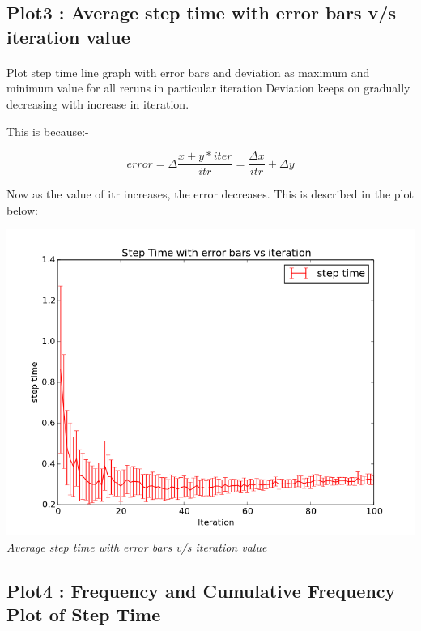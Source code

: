 \documentclass[11pt]{article}
\begin{document}

\subsection{Plot3 : Average step time with error bars v/s iteration value}
\paragraph{}
Plot step time line graph with error bars and deviation as maximum and minimum value for all reruns in particular iteration
Deviation keeps on gradually decreasing with increase in iteration.

This is because:-

\begin{equation}
	error = \Delta \frac {x + y*iter}{itr} = \frac {\Delta{x}}{itr} + \Delta{y}
\end{equation}

Now as the value of itr increases, the error decreases. This is described in the plot below:
\begin{center}
 \includegraphics[scale = 0.4]{images/plots/plot03} \\
  \emph{Average step time with error bars v/s iteration value} \\
\end{center}


\subsection{Plot4 : Frequency and Cumulative Frequency Plot of Step Time}
\end{document}

